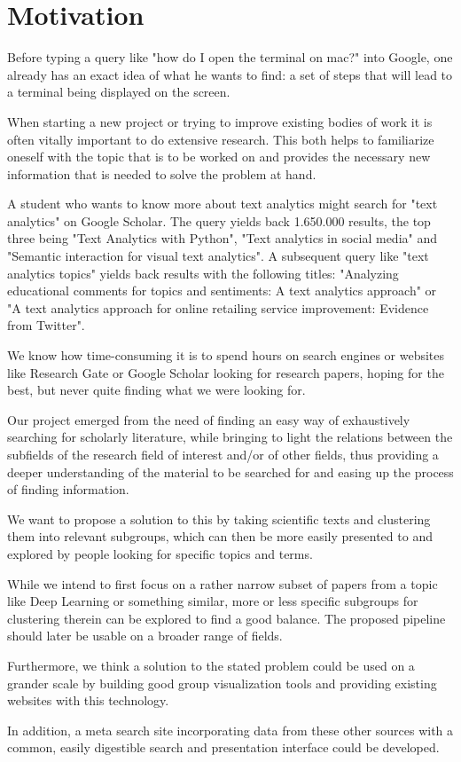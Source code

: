 \section{Motivation}

Before typing a query like "how do I open the terminal on mac?" into Google, one already has an exact idea of what he wants to find: a set of steps that will lead to a terminal being displayed on the screen.

When starting a new project or trying to improve existing bodies of work it is often vitally important to do extensive research. This both helps to familiarize oneself with the topic that is to be worked on and provides the necessary new information that is needed to solve the problem at hand.

A student who wants to know more about text analytics might search for "text analytics" on Google Scholar. The query yields back 1.650.000 results, the top three being "Text Analytics with Python", "Text analytics in social media" and "Semantic interaction for visual text analytics". A subsequent query like "text analytics topics" yields back results with the following titles: "Analyzing educational comments for topics and sentiments: A text analytics approach" or "A text analytics approach for online retailing service improvement: Evidence from Twitter".

We know how time-consuming it is to spend hours on search engines or websites like Research Gate or Google Scholar looking for research papers, hoping for the best, but never quite finding what we were looking for.

Our project emerged from the need of finding an easy way of exhaustively searching for scholarly literature, while bringing to light the relations between the subfields of the research field of interest and/or of other fields, thus providing a deeper understanding of the material to be searched for and easing up the process of finding information.

We want to propose a solution to this by taking scientific texts and clustering them into relevant subgroups, which can then be more easily presented to and explored by people looking for specific topics and terms.

While we intend to first focus on a rather narrow subset of papers from a topic like Deep Learning or something similar, more or less specific subgroups for clustering therein can be explored to find a good balance. The proposed pipeline should later be usable on a broader range of fields.

Furthermore, we think a solution to the stated problem could be used on a grander scale by building good group visualization tools and providing existing websites with this technology.

In addition, a meta search site incorporating data from these other sources with a common, easily digestible search and presentation interface could be developed.